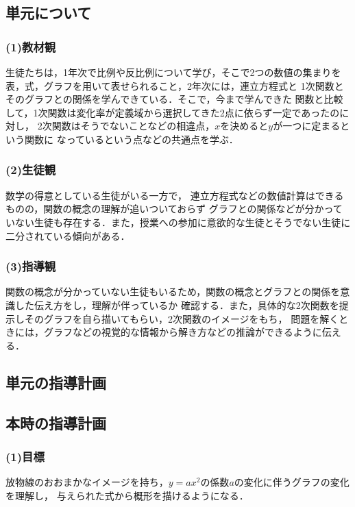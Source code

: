 \documentclass{ltjsarticle}
\begin{document}
\subsection{単元について}\vspace*{-3mm}
  \subsubsection*{(1)教材観}
    生徒たちは，1年次で比例や反比例について学び，そこで2つの数値の集まりを
    表，式，グラフを用いて表せられること，2年次には，連立方程式と
    1次関数とそのグラフとの関係を学んできている．そこで，今まで学んできた
    関数と比較して，1次関数は変化率が定義域から選択してきた2点に依らず一定であったのに対し，
    2次関数はそうでないことなどの相違点，\(x\)を決めると\(y\)が一つに定まるという関数に
    なっているという点などの共通点を学ぶ．
  \subsubsection*{(2)生徒観}
    数学の得意としている生徒がいる一方で，
    連立方程式などの数値計算はできるものの，関数の概念の理解が追いついておらず
    グラフとの関係などが分かっていない生徒も存在する．また，授業への参加に意欲的な生徒とそうでない生徒に二分されている傾向がある． 
  \subsubsection*{(3)指導観}
    関数の概念が分かっていない生徒もいるため，関数の概念とグラフとの関係を意識した伝え方をし，理解が伴っているか
    確認する．また，具体的な2次関数を提示しそのグラフを自ら描いてもらい，2次関数のイメージをもち，
    問題を解くときには，グラフなどの視覚的な情報から解き方などの推論ができるように伝える．
\subsection{単元の指導計画}\vspace*{-3mm}

\subsection{本時の指導計画}\vspace*{-3mm}
  \subsubsection*{(1)目標}
    放物線のおおまかなイメージを持ち，\(y=ax^2\)の係数\(a\)の変化に伴うグラフの変化を理解し，
    与えられた式から概形を描けるようになる．
\end{document}
